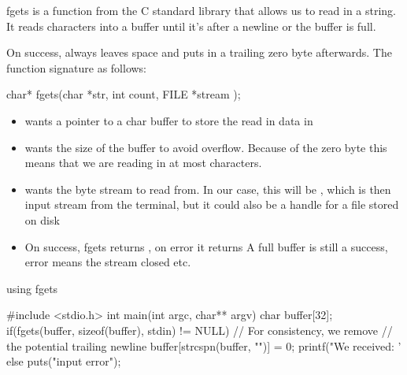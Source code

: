 \documentclass[10pt,graphics,aspectratio=169,table]{beamer}
\begin{document}
\begin{frame}[fragile]{fgets}
     is a function from the C standard library that 
    allows us to read in a string. It reads characters into a buffer
    until it's after a newline or the buffer is full. 
    
    
    On success,  always leaves space
    and puts in a trailing zero byte afterwards. 
    The function signature as follows:

    \begin{codeblock}[numbers=none]
char* fgets(char *str, int count, FILE *stream );
    \end{codeblock}
    \begin{itemize}
        \item {} wants a pointer to a char buffer to 
            store the read in data in
        \item {} wants the size of the 
            buffer to avoid overflow. Because of the zero byte this means 
            that we are reading in at most  characters.
        \item {} wants the byte stream to read from. In our case, this
            will be , which is then input stream from the terminal,
            but it could also be a handle for a file stored on disk 
        \item On success, fgets returns , on error it returns 
              A full buffer is still a success, error means the stream closed etc.
    \end{itemize}
\end{frame}

\begin{frame}[fragile]{using fgets}
    \begin{codeblock}
#include <stdio.h>
int main(int argc, char** argv){
    char buffer[32];
    if(fgets(buffer, sizeof(buffer), stdin) != NULL){
        // For consistency, we remove 
        // the potential trailing newline
        buffer[strcspn(buffer, "\n")] = 0;
        printf("We received: '%
    }
    else{
        puts("input error");
    }
}
    \end{codeblock}
\end{frame}
\end{document}
